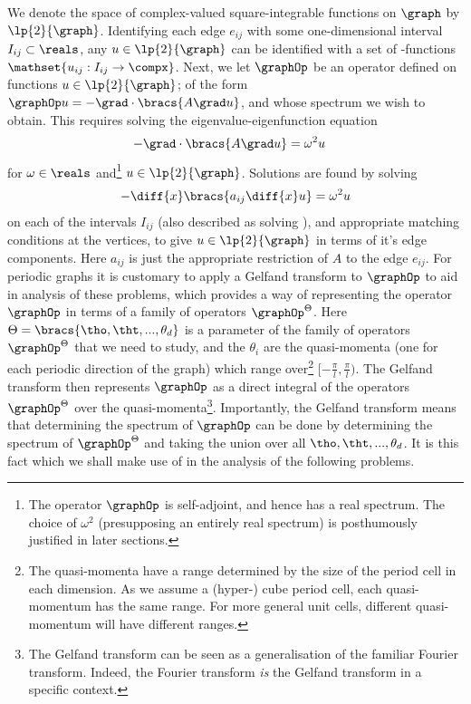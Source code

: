 We denote the space of complex-valued square-integrable functions on $\graph$ by $\lp{2}{\graph}$.
Identifying each edge $e_{ij}$ with some one-dimensional interval $I_{ij}\subset\reals$, any $u\in\lp{2}{\graph}$ can be identified with a set of -functions $\mathset{u_{ij}:I_{ij}\rightarrow\compx}$.
Next, we let $\graphOp$ be an operator defined on functions $u\in \lp{2}{\graph}$; of the form $\graphOp u = -\grad\cdot\bracs{A\grad u}$, and whose spectrum we wish to obtain.
This requires solving the eigenvalue-eigenfunction equation
\begin{align*}
	-\grad\cdot\bracs{A\grad u} &= \omega^{2}u
\end{align*}
for $\omega\in\reals$ and\footnote{The operator $\graphOp$ is self-adjoint, and hence has a real spectrum. The choice of $\omega^{2}$ (presupposing an entirely real spectrum) is posthumously justified in later sections.} $u\in\lp{2}{\graph}$.
Solutions are found by solving 
\begin{align*}
-\diff{x}\bracs{a_{ij}\diff{x}u}=\omega^{2}u
\end{align*} 
on each of the intervals $I_{ij}$ (also described as solving ), and appropriate matching conditions at the vertices, to give $u\in\lp{2}{\graph}$ in terms of it's edge components.
Here $a_{ij}$ is just the appropriate restriction of $A$ to the edge $e_{ij}$.
For periodic graphs it is customary to apply a Gelfand transform to $\graphOp$ to aid in analysis of these problems, which provides a way of representing the operator $\graphOp$ in terms of a family of operators $\graphOp^{\Theta}$.
Here $\Theta=\bracs{\tho, \tht, ..., \theta_{d}}$ is a parameter of the family of operators $\graphOp^{\Theta}$ that we need to study, and the $\theta_{i}$ are the quasi-momenta (one for each periodic direction of the graph) which range over\footnote{The quasi-momenta have a range determined by the size of the period cell in each dimension. As we assume a (hyper-) cube period cell, each quasi-momentum has the same range. For more general unit cells, different quasi-momentum will have different ranges.} $[-\frac{\pi}{l},\frac{\pi}{l})$.
The Gelfand transform then represents $\graphOp$ as a direct integral of the operators $\graphOp^{\Theta}$ over the quasi-momenta\footnote{The Gelfand transform can be seen as a generalisation of the familiar Fourier transform. Indeed, the Fourier transform \textit{is} the Gelfand transform in a specific context.}.
Importantly, the Gelfand transform means that determining the spectrum of $\graphOp$ can be done by determining the spectrum of $\graphOp^{\Theta}$ and taking the union over all $\tho, \tht, ..., \theta_{d}$. 
It is this fact which we shall make use of in the analysis of the following problems. \newline

